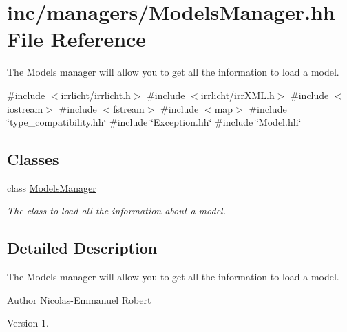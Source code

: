 \hypertarget{ModelsManager_8hh}{}\section{inc/managers/\+Models\+Manager.hh File Reference}
\label{ModelsManager_8hh}


The Models manager will allow you to get all the information to load a model.  


{\ttfamily \#include $<$irrlicht/irrlicht.\+h$>$}\newline
{\ttfamily \#include $<$irrlicht/irr\+X\+M\+L.\+h$>$}\newline
{\ttfamily \#include $<$iostream$>$}\newline
{\ttfamily \#include $<$fstream$>$}\newline
{\ttfamily \#include $<$map$>$}\newline
{\ttfamily \#include \char`\"{}type\+\_\+compatibility.\+hh\char`\"{}}\newline
{\ttfamily \#include \char`\"{}Exception.\+hh\char`\"{}}\newline
{\ttfamily \#include \char`\"{}Model.\+hh\char`\"{}}\newline
\subsection*{Classes}
\begin{DoxyCompactItemize}
\item 
class \hyperlink{classModelsManager}{Models\+Manager}
\begin{DoxyCompactList}\small\item\em The class to load all the information about a model. \end{DoxyCompactList}\end{DoxyCompactItemize}


\subsection{Detailed Description}
The Models manager will allow you to get all the information to load a model. 

\begin{DoxyAuthor}{Author}
Nicolas-\/\+Emmanuel Robert 
\end{DoxyAuthor}
\begin{DoxyVersion}{Version}
1. 
\end{DoxyVersion}
